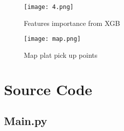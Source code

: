 \documentclass[12pt,report]{ucdavisthesis}
\begin{document}
    \begin{figure}
    	\centering
    	\texttt{[image: 4.png]}
    	\caption{Features importance from XGB}
    	\label{fig:gull}
    \end{figure}
    
     \begin{figure}
     	\centering
     	\texttt{[image: map.png]}
     	\caption{Map plat pick up points}
     	\label{fig:gull}
     \end{figure}
     \newpage
     \newpage
     \section{Source Code}
     \subsection{Main.py}
\end{document}
